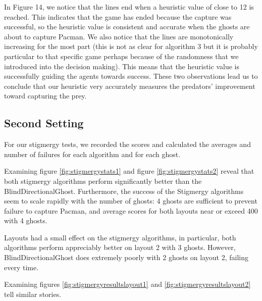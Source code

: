 \documentclass[11pt]{article}
\begin{document}
\begin{multicols}{2}
\noindent In Figure 14, we notice that the lines end when a heuristic value of close to 12 is reached. This indicates that the game has ended because the capture was successful, so the heuristic value is consistent and accurate when the ghosts are about to capture Pacman. We also notice that the lines are monotonically increasing for the most part (this is not as clear for algorithm 3 but it is probably particular to that specific game perhaps because of the randomness that we introduced into the decision making). This means that the heuristic value is successfully guiding the agents towards success. These two observations lead us to conclude that our heuristic very accurately measures the predators' improvement toward capturing the prey. 

\subsection{Second Setting}

For our stigmergy tests, we recorded the scores and calculated the averages and number of failures for each algorithm and for each ghost. 

Examining figure \ref{fig:stigmergystats1} and figure \ref{fig:stigmergystats2} reveal that both stigmergy algorithms perform significantly better than the BlindDirectionalGhost.  Furthermore, the success of the Stigmergy algorithms seem to scale rapidly with the number of ghosts: 4 ghosts are sufficient to prevent failure to capture Pacman, and average scores for both layouts near or exceed 400 with 4 ghosts. 

Layouts had a small effect on the stigmergy algorithms, in particular, both algorithms perform appreciably better on layout 2 with 3 ghosts.  However, BlindDirectionalGhost does extremely poorly with 2 ghosts on layout 2, failing every time.

Examining figures \ref{fig:stigmergyresultslayout1} and \ref{fig:stigmergyresultslayout2} tell similar stories.  

\end{multicols}
\end{document}
